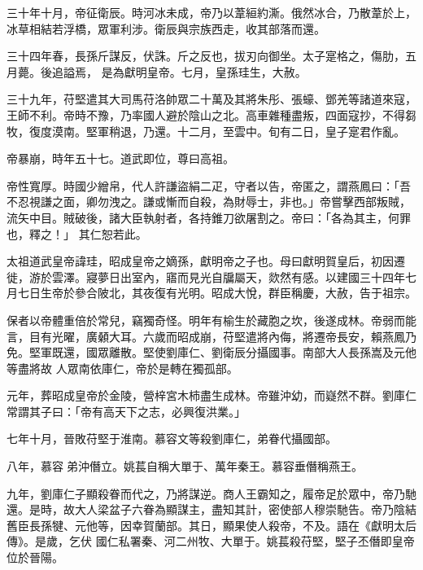 \begin{pinyinscope}
 三十年十月，帝征衛辰。時河冰未成，帝乃以葦絙約澌。俄然冰合，乃散葦於上，冰草相結若浮橋，眾軍利涉。衛辰與宗族西走，收其部落而還。



 三十四年春，長孫斤謀反，伏誅。斤之反也，拔刃向御坐。太子寔格之，傷肋，五月薨。後追謚焉，
 是為獻明皇帝。七月，皇孫珪生，大赦。



 三十九年，苻堅遣其大司馬苻洛帥眾二十萬及其將朱彤、張蠔、鄧羌等諸道來寇，王師不利。帝時不豫，乃率國人避於陰山之北。高車雜種盡叛，四面寇抄，不得芻牧，復度漠南。堅軍稍退，乃還。十二月，至雲中。旬有二日，皇子寔君作亂。



 帝暴崩，時年五十七。道武即位，尊曰高祖。



 帝性寬厚。時國少繒帛，代人許謙盜絹二疋，守者以告，帝匿之，謂燕鳳曰：「吾不忍視謙之面，卿勿洩之。謙或慚而自殺，為財辱士，非也。」帝嘗擊西部叛賊，流矢中目。賊破後，諸大臣執射者，各持錐刀欲屠割之。帝曰：「各為其主，何罪也，釋之！」
 其仁恕若此。



 太祖道武皇帝諱珪，昭成皇帝之嫡孫，獻明帝之子也。母曰獻明賀皇后，初因遷徙，游於雲澤。寢夢日出室內，寤而見光自牖屬天，欻然有感。以建國三十四年七月七日生帝於參合陂北，其夜復有光明。昭成大悅，群臣稱慶，大赦，告于祖宗。



 保者以帝體重倍於常兒，竊獨奇怪。明年有榆生於藏胞之坎，後遂成林。帝弱而能言，目有光曜，廣顙大耳。六歲而昭成崩，苻堅遣將內侮，將遷帝長安，賴燕鳳乃免。堅軍既還，國眾離散。堅使劉庫仁、劉衛辰分攝國事。南部大人長孫嵩及元他等盡將故
 人眾南依庫仁，帝於是轉在獨孤部。



 元年，葬昭成皇帝於金陵，營梓宮木柿盡生成林。帝雖沖幼，而嶷然不群。劉庫仁常謂其子曰：「帝有高天下之志，必興復洪業。」



 七年十月，晉敗苻堅于淮南。慕容文等殺劉庫仁，弟眷代攝國部。



 八年，慕容弟沖僭立。姚萇自稱大單于、萬年秦王。慕容垂僭稱燕王。



 九年，劉庫仁子顯殺眷而代之，乃將謀逆。商人王霸知之，履帝足於眾中，帝乃馳還。是時，故大人梁盆子六眷為顯謀主，盡知其計，密使部人穆崇馳告。帝乃陰結舊臣長孫犍、元他等，因幸賀蘭部。其日，顯果使人殺帝，不及。語在《獻明太后傳》。是歲，乞伏
 國仁私署秦、河二州牧、大單于。姚萇殺苻堅，堅子丕僭即皇帝位於晉陽。




\end{pinyinscope}
